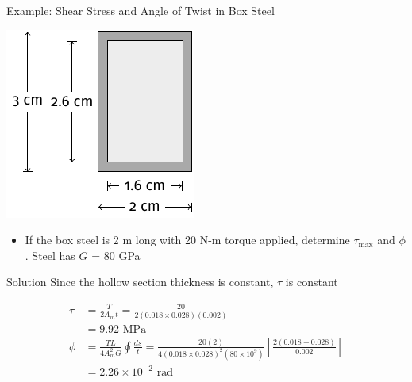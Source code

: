 \documentclass[10pt, svgnames]{beamer}
\begin{document}
\begin{frame}[label={sec:org3485d22}]{Example: Shear Stress and Angle of Twist in Box Steel}
\begin{center}
\includegraphics[height=0.5\textheight]{pictures/thin-walled-example.pdf}
\end{center}

\begin{itemize}
\item If the box steel is 2 m long with 20 N-m torque applied, determine
\(\tau_{\max}\) and \(\phi\). Steel has \(G\) = 80 GPa
\end{itemize}
\end{frame}

\begin{frame}[label={sec:org554a56b}]{Solution}
Since the hollow section thickness is constant, \(\tau\) is constant

\begin{align*}
    \tau &= \frac{T}{2 A_{m} t} = \frac{20}{2 (0.018 \times 0.028) (0.002)} \\
         &= 9.92 \text{ MPa} \\
    \phi &= \frac{TL}{4A_{m}^{2}G} \oint \frac{ds}{t} = \frac{20(2)}{4(0.018 \times 0.028)^{2}(80 \times 10^{9})} \left[ \frac{2(0.018+0.028)}{0.002} \right] \\
         &= 2.26 \times 10^{-2} \text{ rad}
\end{align*}
\end{frame}
\end{document}
